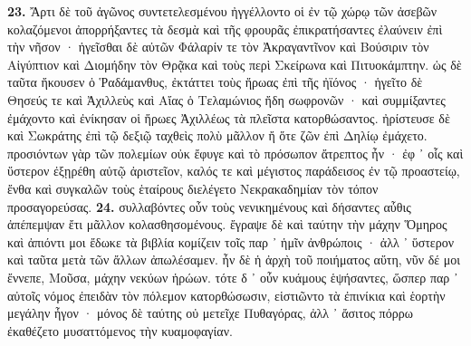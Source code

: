 \documentclass[a4paper, 11pt, oneside, polutonikogreek, german]{article}
\begin{document}
\textbf{23.} Ἄρτι δὲ τοῦ ἀγῶνος συντετελεσμένου ἠγγέλλοντο οἱ ἐν τῷ χώρῳ τῶν ἀσεβῶν κολαζόμενοι ἀπορρήξαντες τὰ δεσμὰ καὶ τῆς φρουρᾶς ἐπικρατήσαντες ἐλαύνειν ἐπὶ τὴν νῆσον · ἡγεῖσθαι δὲ αὐτῶν Φάλαρίν τε τὸν Ἀκραγαντῖνον καὶ Βούσιριν τὸν Αἰγύπτιον καὶ Διομήδην τὸν Θρᾷκα καὶ τοὺς περὶ Σκείρωνα καὶ Πιτυοκάμπτην. ὡς δὲ ταῦτα ἤκουσεν ὁ Ῥαδάμανθυς, ἐκτάττει τοὺς ἥρωας ἐπὶ τῆς ἠϊόνος · ἡγεῖτο δὲ Θησεύς τε καὶ Ἀχιλλεὺς καὶ Αἴας ὁ Τελαμώνιος ἤδη σωφρονῶν · καὶ συμμίξαντες ἐμάχοντο καὶ ἐνίκησαν οἱ ἥρωες Ἀχιλλέως τὰ πλεῖστα κατορθώσαντος. ἠρίστευσε δὲ καὶ Σωκράτης ἐπὶ τῷ δεξιῷ ταχθεὶς πολὺ μᾶλλον ἤ ὅτε ζῶν ἐπὶ Δηλίῳ ἐμάχετο. προσιόντων γὰρ τῶν πολεμίων οὐκ ἔφυγε καὶ τὸ πρόσωπον ἄτρεπτος ἦν · ἐφ ᾽ οἷς καὶ ὕστερον ἐξῃρέθη αὐτῷ ἀριστεῖον, καλός τε καὶ μέγιστος παράδεισος ἐν τῷ προαστείῳ, ἔνθα καὶ συγκαλῶν τοὺς ἑταίρους διελέγετο Νεκρακαδημίαν τὸν τόπον προσαγορεύσας. \textbf{24.} συλλαβόντες οὖν τοὺς νενικημένους καὶ δήσαντες αὖθις ἀπέπεμψαν ἔτι μᾶλλον κολασθησομένους. ἔγραψε δὲ καὶ ταύτην τὴν μάχην Ὅμηρος καὶ ἀπιόντι μοι ἔδωκε τὰ βιβλία κομίζειν τοῖς παρ ᾽ ἡμῖν ἀνθρώποις · ἀλλ ᾽ ὕστερον καὶ ταῦτα μετὰ τῶν ἄλλων ἀπωλέσαμεν. ἦν δὲ ἡ ἀρχὴ τοῦ ποιήματος αὕτη, νῦν δέ μοι ἔννεπε, Μοῦσα, μάχην νεκύων ἡρώων. τότε δ ᾽ οὖν κυάμους ἑψήσαντες, ὥσπερ παρ ᾽ αὐτοῖς νόμος ἐπειδὰν τὸν πόλεμον κατορθώσωσιν, εἱστιῶντο τὰ ἐπινίκια καὶ ἑορτὴν μεγάλην ἦγον · μόνος δὲ ταύτης οὐ μετεῖχε Πυθαγόρας, ἀλλ ᾽ ἄσιτος πόρρω ἐκαθέζετο μυσαττόμενος τὴν κυαμοφαγίαν.
\end{document}
